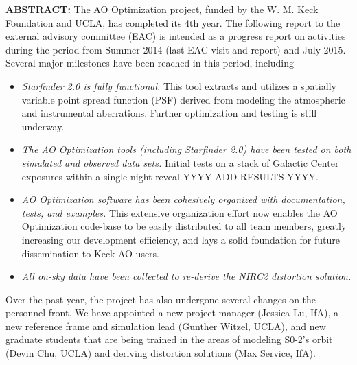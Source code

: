 \textbf{ABSTRACT:} The AO Optimization project, funded by the W. M. Keck Foundation and UCLA, has completed its 4th year. The following report to the external advisory committee (EAC) is intended as a progress report on activities during the period from Summer 2014 (last EAC visit and report) and July 2015. Several major milestones have been reached in this period, including
\begin{itemize}
\item {\em Starfinder 2.0 is fully functional.} This tool extracts and utilizes a spatially variable point spread function (PSF) derived from modeling the atmospheric and instrumental
aberrations. Further optimization and testing is still underway.
\item {\em The AO Optimization tools (including Starfinder 2.0) have been tested on both simulated and observed data sets.} Initial tests on a stack of Galactic Center exposures within a single night reveal YYYY ADD RESULTS YYYY.
\item {\em AO Optimization software has been cohesively organized with documentation, tests, and examples.} This extensive organization effort now enables the AO Optimization code-base to be easily distributed to all team members, greatly increasing our development efficiency, and lays a solid foundation for future dissemination to Keck AO users.
\item {\em All on-sky data have been collected to re-derive the NIRC2 distortion solution.}
\end{itemize}
Over the past year, the project has also undergone several changes on the personnel front. We have appointed a new project manager (Jessica Lu, IfA), a new reference frame and simulation lead (Gunther Witzel, UCLA), and new graduate students that are being trained in the areas of modeling S0-2’s orbit (Devin Chu, UCLA) and deriving distortion solutions (Max Service, IfA). 

  